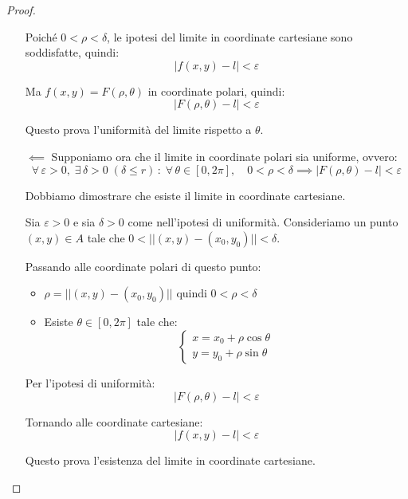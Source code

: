 \documentclass{article}
\theoremstyle{plain}
\theoremstyle{definition}
\theoremstyle{remark}
\begin{document}
\begin{proof}
\begin{itemize}
        Poiché $0<\rho<\delta$, le ipotesi del limite in coordinate cartesiane sono soddisfatte, quindi:
        \[|f(x,y)-l|<\varepsilon\]
        
        Ma $f(x,y)=F(\rho,\theta)$ in coordinate polari, quindi:
        \[|F(\rho,\theta)-l|<\varepsilon\]
        
        Questo prova l'uniformità del limite rispetto a $\theta$.

        \item[$\impliedby$] Supponiamo ora che il limite in coordinate polari sia uniforme, ovvero:
        \[\forall\,\varepsilon>0,\;\exists\,\delta>0\;(\delta\leq r)\,:\;\forall\,\theta\in[0,2\pi],\quad 0<\rho<\delta\implies|F(\rho,\theta)-l|<\varepsilon\]
        
        Dobbiamo dimostrare che esiste il limite in coordinate cartesiane.
        
        Sia $\varepsilon>0$ e sia $\delta>0$ come nell'ipotesi di uniformità. Consideriamo un punto $(x,y)\in A$ tale che $0<||(x,y)-(x_0,y_0)||<\delta$.
        
        Passando alle coordinate polari di questo punto:
        \begin{itemize}
            \item $\rho=||(x,y)-(x_0,y_0)||$ quindi $0<\rho<\delta$
            \item Esiste $\theta\in[0,2\pi]$ tale che:
            \[\begin{cases}
                x=x_0+\rho\cos\theta\\
                y=y_0+\rho\sin\theta
            \end{cases}\]
        \end{itemize}
        
        Per l'ipotesi di uniformità:
        \[|F(\rho,\theta)-l|<\varepsilon\]
        
        Tornando alle coordinate cartesiane:
        \[|f(x,y)-l|<\varepsilon\]
        
        Questo prova l'esistenza del limite in coordinate cartesiane.
    \end{itemize}
\end{proof}

\vspace{10pt}
\end{document}
